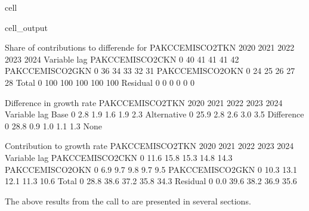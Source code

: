 \documentclass[letterpaper,10pt,english]{jupyterBook}
\begin{document}
\begin{sphinxuseclass}{cell}
\begin{sphinxVerbatimOutput}
\begin{sphinxuseclass}{cell_output}
\begin{sphinxVerbatim}[commandchars=\\\{\}]
 Share of contributions to differende for  PAKCCEMISCO2TKN
                           2020        2021        2022        2023        2024
Variable        lag                                                            
PAKCCEMISCO2CKN 0           40\PYGZpc{}         41\PYGZpc{}         41\PYGZpc{}         41\PYGZpc{}         42\PYGZpc{}
PAKCCEMISCO2GKN 0           36\PYGZpc{}         34\PYGZpc{}         33\PYGZpc{}         32\PYGZpc{}         31\PYGZpc{}
PAKCCEMISCO2OKN 0           24\PYGZpc{}         25\PYGZpc{}         26\PYGZpc{}         27\PYGZpc{}         28\PYGZpc{}
Total           0          100\PYGZpc{}        100\PYGZpc{}        100\PYGZpc{}        100\PYGZpc{}        100\PYGZpc{}
Residual        0           \PYGZhy{}0\PYGZpc{}          0\PYGZpc{}          0\PYGZpc{}          0\PYGZpc{}          0\PYGZpc{}

 Difference in growth rate PAKCCEMISCO2TKN
                       2020        2021        2022        2023        2024
Variable    lag                                                            
Base        0          2.8\PYGZpc{}        1.9\PYGZpc{}        1.6\PYGZpc{}        1.9\PYGZpc{}        2.3\PYGZpc{}
Alternative 0        \PYGZhy{}25.9\PYGZpc{}        2.8\PYGZpc{}        2.6\PYGZpc{}        3.0\PYGZpc{}        3.5\PYGZpc{}
Difference  0        \PYGZhy{}28.8\PYGZpc{}        0.9\PYGZpc{}        1.0\PYGZpc{}        1.1\PYGZpc{}        1.3\PYGZpc{}
None

 Contribution to growth rate PAKCCEMISCO2TKN
                           2020        2021        2022        2023        2024
Variable        lag                                                            
PAKCCEMISCO2CKN 0        \PYGZhy{}11.6\PYGZpc{}      \PYGZhy{}15.8\PYGZpc{}      \PYGZhy{}15.3\PYGZpc{}      \PYGZhy{}14.8\PYGZpc{}      \PYGZhy{}14.3\PYGZpc{}
PAKCCEMISCO2OKN 0         \PYGZhy{}6.9\PYGZpc{}       \PYGZhy{}9.7\PYGZpc{}       \PYGZhy{}9.8\PYGZpc{}       \PYGZhy{}9.7\PYGZpc{}       \PYGZhy{}9.5\PYGZpc{}
PAKCCEMISCO2GKN 0        \PYGZhy{}10.3\PYGZpc{}      \PYGZhy{}13.1\PYGZpc{}      \PYGZhy{}12.1\PYGZpc{}      \PYGZhy{}11.3\PYGZpc{}      \PYGZhy{}10.6\PYGZpc{}
Total           0        \PYGZhy{}28.8\PYGZpc{}      \PYGZhy{}38.6\PYGZpc{}      \PYGZhy{}37.2\PYGZpc{}      \PYGZhy{}35.8\PYGZpc{}      \PYGZhy{}34.3\PYGZpc{}
Residual        0          0.0\PYGZpc{}      \PYGZhy{}39.6\PYGZpc{}      \PYGZhy{}38.2\PYGZpc{}      \PYGZhy{}36.9\PYGZpc{}      \PYGZhy{}35.6\PYGZpc{}
\end{sphinxVerbatim}

\end{sphinxuseclass}\end{sphinxVerbatimOutput}

\end{sphinxuseclass}
\sphinxAtStartPar
The above results from the call to  are presented in several sections.
\end{document}

